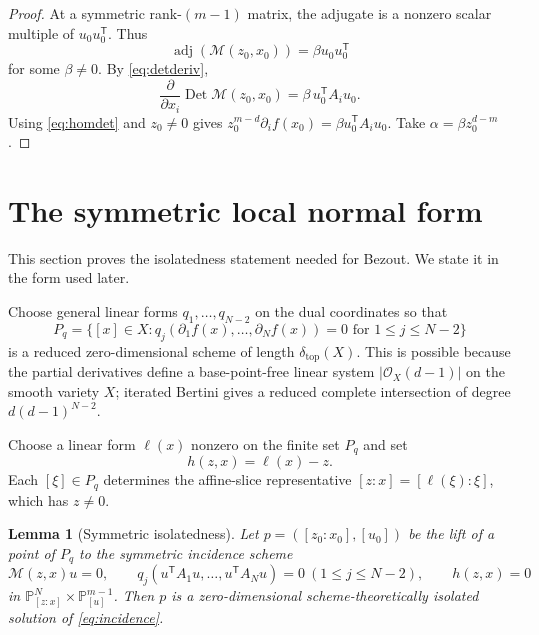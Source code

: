 \documentclass[11pt]{article}
\theoremstyle{plain}
\newtheorem{lemma}{Lemma}
\theoremstyle{definition}
\DeclareMathOperator{\adj}{adj}
\DeclareMathOperator{\Det}{Det}
\newcommand{\PP}{\mathbb{P}}
\newcommand{\OO}{\mathcal O}
\newcommand{\Mcal}{\mathcal M}
\newcommand{\pdeg}{\delta}
\begin{document}
\begin{proof}
At a symmetric rank-$(m-1)$ matrix, the adjugate is a nonzero scalar multiple of
$u_0u_0^{\mathsf T}$.  Thus
\[
  \adj(\Mcal(z_0,x_0))=\beta u_0u_0^{\mathsf T}
\]
for some $\beta\ne0$.  By \eqref{eq:detderiv},
\[
  \frac{\partial}{\partial x_i}\Det\Mcal(z_0,x_0)
  =\beta\,u_0^{\mathsf T}A_i u_0.
\]
Using \eqref{eq:homdet} and $z_0\ne0$ gives
$z_0^{m-d}\partial_i f(x_0)=\beta u_0^{\mathsf T}A_i u_0$.  Take
$\alpha=\beta z_0^{d-m}$.
\end{proof}

\section{The symmetric local normal form}
\label{sec:local}

This section proves the isolatedness statement needed for Bezout.  We state it
in the form used later.

Choose general linear forms $q_1,\ldots,q_{N-2}$ on the dual coordinates so that
\[
  P_q=\{[x]\in X:q_j(\partial_1f(x),\ldots,\partial_Nf(x))=0
  \text{ for }1\le j\le N-2\}
\]
is a reduced zero-dimensional scheme of length $\pdeg_{\mathrm{top}}(X)$.  This
is possible because the partial derivatives define a base-point-free linear
system $|\OO_X(d-1)|$ on the smooth variety $X$; iterated Bertini gives a
reduced complete intersection of degree $d(d-1)^{N-2}$.

Choose a linear form $\ell(x)$ nonzero on the finite set $P_q$ and set
\[
  h(z,x)=\ell(x)-z.
\]
Each $[\xi]\in P_q$ determines the affine-slice representative
$[z:x]=[\ell(\xi):\xi]$, which has $z\ne0$.

\begin{lemma}[Symmetric isolatedness]
\label{lem:isolated}
Let $p=([z_0:x_0],[u_0])$ be the lift of a point of $P_q$ to the symmetric
incidence scheme
\begin{equation}
\label{eq:incidence}
  \Mcal(z,x)u=0,
  \qquad
  q_j(u^{\mathsf T}A_1u,\ldots,u^{\mathsf T}A_Nu)=0\ (1\le j\le N-2),
  \qquad
  h(z,x)=0
\end{equation}
in $\PP^N_{[z:x]}\times\PP^{m-1}_{[u]}$.  Then $p$ is a zero-dimensional
scheme-theoretically isolated solution of \eqref{eq:incidence}.
\end{lemma}
\end{document}
